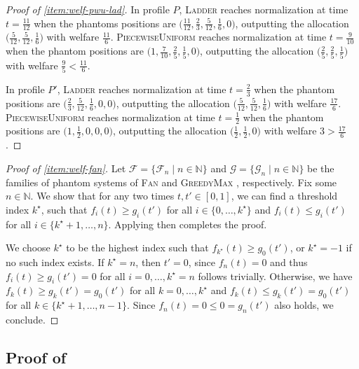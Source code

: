 \documentclass[11pt]{article}
\newcommand{\F}{\mathcal{F}}
\newcommand{\G}{\mathcal{G}}
\newcommand{\N}{\mathbb{N}}
\newcommand{\Ladder}{\textsc{Ladder} }
\newcommand{\GreedyMax}{\textsc{GreedyMax} }
\newcommand{\Fan}{\textsc{Fan} }
\newcommand{\PiecewiseUniform}{\textsc{PiecewiseUniform} }
\begin{document}
\begin{proof}[Proof of  \textnormal{\ref{item:welf-pwu-lad}}]
    In profile $P$, \Ladder reaches normalization at time $t = \frac{11}{12}$ when the phantoms positions are $\big( \frac{11}{12}, \frac{2}{3}, \frac{5}{12}, \frac{1}{6}, 0\big)$, outputting the allocation $\big(\frac{5}{12}, \frac{5}{12}, \frac{1}{6}\big)$ with welfare $\frac{11}{6}$. \PiecewiseUniform reaches normalization at time $t = \frac{9}{10}$ when the phantom positions are $\big( 1, \frac{7}{10}, \frac{2}{5}, \frac{1}{5}, 0 \big)$, outputting the allocation $\big(\frac{2}{5}, \frac{2}{5}, \frac{1}{5}\big)$ with welfare $\frac{9}{5} < \frac{11}{6}$.

    In profile $P'$, \Ladder reaches normalization at time $t = \frac{2}{3}$ when the phantom positions are $\big( \frac{2}{3}, \frac{5}{12}, \frac{1}{6}, 0, 0\big)$, outputting the allocation $\big(\frac{5}{12}, \frac{5}{12}, \frac{1}{6}\big)$ with welfare $\frac{17}{6}$. \PiecewiseUniform reaches normalization at time $t = \frac{1}{2}$ when the phantom positions are $\big( 1, \frac{1}{2}, 0, 0, 0 \big)$, outputting the allocation $\big(\frac{1}{2}, \frac{1}{2}, 0\big)$ with welfare $3 > \frac{17}{6}$.
\end{proof}

\begin{proof}[Proof of  \textnormal{\ref{item:welf-fan}}]
    Let $\F = \{\F_n \mid n \in \N\}$ and  $\G = \{\G_n \mid n \in \N\}$ be the families of phantom systems of \Fan and \GreedyMax, respectively. Fix some $n \in \N$. We show that for any two times $t, t' \in [0,1]$, we can find a threshold index $k^\star$, such that $f_i(t) \ge g_i(t')$ for all $i \in \{0, \dots, k^\star\}$ and $f_i(t) \le g_i(t')$ for all $i \in \{k^\star+1, \dots, n\}$. Applying  then completes the proof.

    We choose $k^\star$ to be the highest index such that $f_{k^\star}(t) \ge g_{0}(t')$, or $k^\star = -1$ if no such index exists. If $k^\star = n$, then $t' = 0$, since $f_n(t) = 0$ and thus $f_i(t) \ge g_i(t') = 0$ for all $i = 0, \dots, k^\star = n$ follows trivially. Otherwise, we have $f_k(t) \ge g_k(t') = g_{0}(t')$ for all $k = 0, \dots, k^\star$ and $f_k(t) \le g_k(t') = g_{0}(t')$ for all $k \in \{k^\star+1, \dots, n-1\}$. Since $f_n(t) = 0 \le 0 = g_n(t')$ also holds, we conclude.
\end{proof}


\subsection{Proof of }\label{app:lemProportionalPhantoms}
\end{document}
